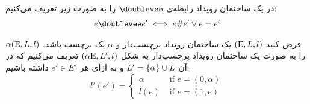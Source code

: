 \begin{definition}
    در یک ساختمان رویداد رابطه‌ی
    $\doublevee$
    را به صورت زیر تعریف می‌کنیم:
    \begin{align*}
        e \doublevee e' \iff e \# e' \vee e = e'
    \end{align*}
\end{definition}

\begin{definition}
    فرض کنید
    $(\mathrm{E},L,l)$
    یک ساختمان رویداد برچسب‌دار و
    $\alpha$
    یک برچسب باشد.
    $\alpha(\mathrm{E},L,l)$
    را به صورت یک ساختمان رویداد برچسب‌دار به شکل
    $(\alpha \mathrm{E},L',l)$
    تعریف می‌کنیم که در آن
    $L' = \{\alpha\}\cup L$
    و به ازای هر
    $e' \in E'$
    داشته باشیم:
    $$
        l'(e') = \begin{cases}
            \alpha & \text{ if } e = (0,\alpha) \\
            l(e)   & \text{ if } e = (1,e)
        \end{cases}
    $$
\end{definition}
